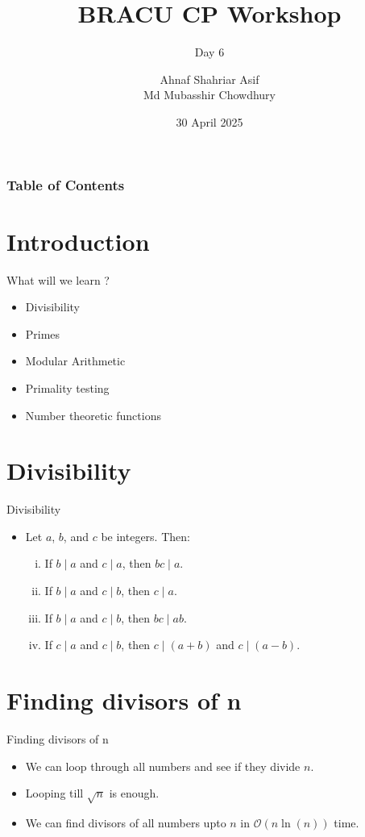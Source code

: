 \documentclass{beamer}
\title{BRACU CP Workshop}
\subtitle{Day 6}
\author{
    Ahnaf Shahriar Asif\\
    Md Mubasshir Chowdhury
}
\institute{BRAC University, Dhaka}
\date{30 April 2025}
\begin{document}
\frame{\titlepage}
\begin{frame}
  \frametitle{Table of Contents}
  \tableofcontents
\end{frame}

\section{Introduction}
\begin{frame}{What will we learn ?}
\begin{itemize}
    \item<1-> Divisibility  
    \item<2-> Primes
    \item<3-> Modular Arithmetic
    \item<4-> Primality testing
    \item<5-> Number theoretic functions
\end{itemize}
\end{frame}

\section{Divisibility}
\begin{frame}{Divisibility}
\begin{itemize}
  \item<1-> Let \(a\), \(b\), and \(c\) be integers. Then:
  \begin{enumerate}[(i)]
    \item If \(b \mid a\) and \(c \mid a\), then \(bc \mid a\).
    \item If \(b \mid a\) and \(c \mid b\), then \(c \mid a\).
    \item If \(b \mid a\) and \(c \mid b\), then \(bc \mid ab\).
    \item If \(c \mid a\) and \(c \mid b\), then \(c \mid (a + b)\) and \(c \mid (a - b)\).
  \end{enumerate}
\end{itemize}
\end{frame}

\section{Finding divisors of n}
\begin{frame}{Finding divisors of n}
\begin{itemize}
  \item<1-> We can loop through all numbers and see if they divide \(n\). 
  \item<2-> Looping till $\sqrt{n}$ is enough.
  \item<3-> We can find divisors of all numbers upto $n$ in $\mathcal{O}(n \ln(n))$ time.
\end{itemize}
\end{frame}
\end{document}
